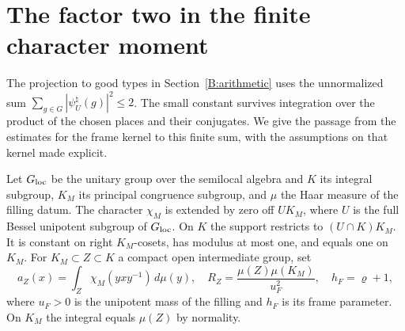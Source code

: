 \section{The factor two in the finite character moment}\label{sz:shells}
The projection to good types in Section~\ref{B:arithmetic} uses the
unnormalized sum $\sum_{g\in G}|\psi_U^\natural(g)|^2\le2$. The small
constant survives integration over the product of the chosen places and
their conjugates. We give the passage from the estimates for the frame
kernel to this finite sum, with the assumptions on that kernel made explicit.

Let $G_{\rm loc}$ be the unitary group over the semilocal algebra and $K$ its integral subgroup, $K_M$ its
principal congruence subgroup, and $\mu$ the Haar measure of the filling
datum. The character $\chi_M$ is extended by zero off $U K_M$, where
$U$ is the full Bessel unipotent subgroup of $G_{\rm loc}$. On $K$ the support restricts to $(U\cap K)K_M$. It is constant on
right $K_M$-cosets, has modulus at most one, and equals one on $K_M$.
For $K_M\subset Z\subset K$ a compact open intermediate group, set
\[
 a_Z(x)=\int_Z\chi_M(yxy^{-1})\,d\mu(y),\quad
 R_Z=\frac{\mu(Z)\mu(K_M)}{u_F^2},\quad h_F=\varrho+1,
\]
where $u_F>0$ is the unipotent mass of the filling and $h_F$ is its frame
parameter. On $K_M$ the integral equals $\mu(Z)$ by normality.

